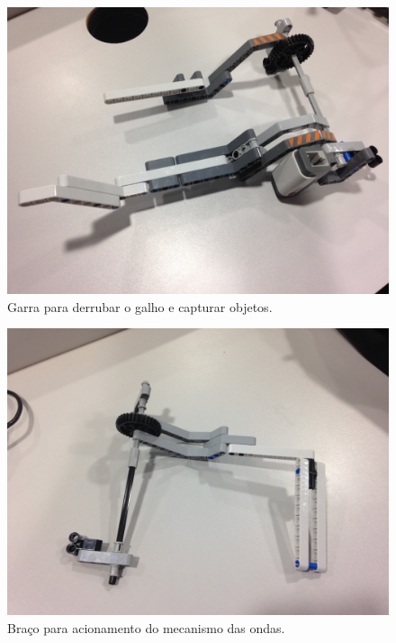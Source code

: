 \documentclass{article}
\begin{document}
	\begin{figure}[h!]
		\includegraphics[width=\linewidth]{images/Garra_2.JPG}
		\caption{Garra para derrubar o galho e capturar objetos.}
		\label{fig:claw_2}
	\end{figure}

	\begin{figure}[h!]
		\includegraphics[width=\linewidth]{images/Garra_3.JPG}
		\caption{Braço para acionamento do mecanismo das ondas.}
		\label{fig:claw_3}
	\end{figure}
\end{document}
